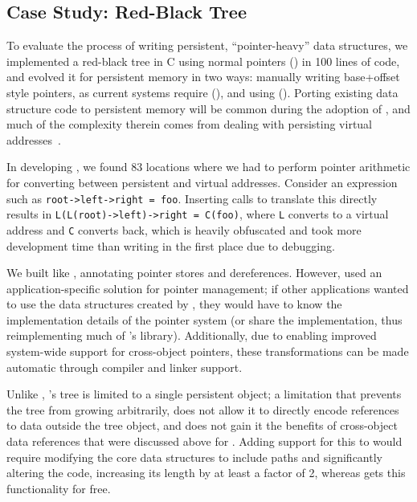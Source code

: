 {    %
    \subsection{Case Study: Red-Black Tree}
    To evaluate the process of writing persistent, ``pointer-heavy'' data
    structures,
    we implemented a red-black tree in C using normal pointers (\ramrbt)
    in 100 lines of code,
    and evolved it for persistent memory in two ways: manually writing
    base+offset style pointers, as current systems require (\unixrbt),
    and using \Twizzler (\nvrbt).
    Porting existing data structure code to persistent memory
    will be common during the adoption of \NVM, and much of the complexity therein
    comes from dealing with persisting virtual addresses~\cite{virendra:hotstorage17}.

    In developing \unixrbt, we found 83 locations where we had to perform pointer arithmetic for
    converting between persistent and virtual addresses.  Consider an expression such as
    \texttt{root->left->right = foo}. Inserting calls to translate this directly results in
    \texttt{L(L(root)->left)->right = C(foo)}, where \texttt{L} converts to a virtual address and
    \texttt{C} converts back, which is heavily obfuscated and took more development time than writing
    \ramrbt in the first place due to debugging.

    We built \nvrbt like \unixrbt, annotating pointer stores and
    dereferences. However, \unixrbt used an application-specific solution for pointer
    management; if other applications wanted to use the data structures created by \unixrbt, they would
    have to know the implementation details of the pointer system (or share the implementation, thus
    reimplementing much of \Twizzler's library).  Additionally, due to \Twizzler enabling improved
    system-wide support for cross-object pointers, these transformations can be made automatic through
    compiler and linker support.

    Unlike \nvrbt, \unixrbt's tree is limited to a single persistent
    object; a limitation that prevents the tree from growing arbitrarily, does not
    allow it to directly encode references to data outside the tree object, and does
    not gain it the benefits of cross-object data references that were discussed
    above for \nvkv. Adding support for this to \unixrbt would require modifying the
    core data structures to include paths and significantly altering the code,
    increasing its length by at least a factor of 2, whereas \nvrbt gets this
    functionality for free.

}
